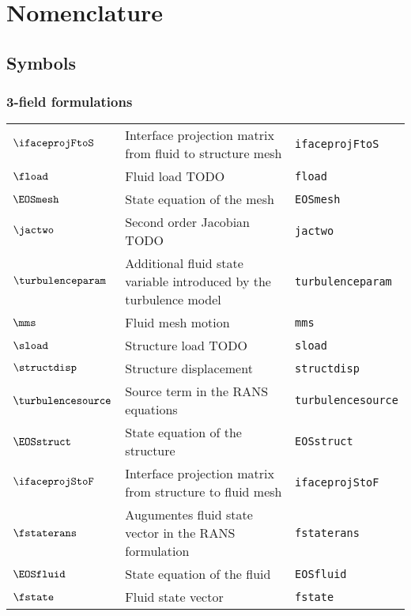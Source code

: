\section*{Nomenclature}\label{sec:nomenclature}

\subsection*{Symbols}

\subsubsection*{3-field formulations}
\begin{tabular}{l l l}
$\ifaceprojFtoS$ & Interface projection matrix from fluid to structure mesh& \texttt{ifaceprojFtoS}\\
$\fload$ & Fluid load TODO& \texttt{fload}\\
$\EOSmesh$ & State equation of the mesh& \texttt{EOSmesh}\\
$\jactwo$ & Second order Jacobian  TODO& \texttt{jactwo}\\
$\turbulenceparam$ & Additional fluid state variable introduced by the turbulence model& \texttt{turbulenceparam}\\
$\mms$ & Fluid mesh motion& \texttt{mms}\\
$\sload$ & Structure load TODO& \texttt{sload}\\
$\structdisp$ & Structure displacement& \texttt{structdisp}\\
$\turbulencesource$ & Source term in the RANS equations& \texttt{turbulencesource}\\
$\EOSstruct$ & State equation of the structure& \texttt{EOSstruct}\\
$\ifaceprojStoF$ & Interface projection matrix from structure to fluid mesh& \texttt{ifaceprojStoF}\\
$\fstaterans$ & Augumentes fluid state vector in the RANS formulation& \texttt{fstaterans}\\
$\EOSfluid$ & State equation of the fluid& \texttt{EOSfluid}\\
$\fstate$ & Fluid state vector& \texttt{fstate}\\
\end{tabular}

